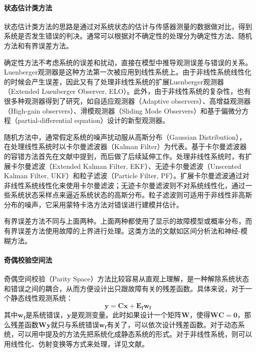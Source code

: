 \documentclass{article}
\begin{document}
\paragraph{状态估计类方法}状态估计类方法的思路是通过对系统状态的估计与传感器测量的数据做对比，得到系统是否发生错误的判决。通常可以根据对不确定性的处理分为确定性方法、随机方法和有界误差方法\cite{Marzat2012modelbased}。

确定性方法\cite{1098323,ALCORTAGARCIA1997663}不考虑系统的误差和扰动，直接在模型中推导观测误差与错误的关系。Luenberger观测器\cite{1098323}是这种方法第一次被应用到线性系统上。由于非线性系统线性化的时候会产生误差，因此又有了处理非线性系统的扩展Luenberger观测器（Extended
Luenberger Observer, ELO）\cite{Nejjari2008Extended,ZEITZ1987149}。此外，由于非线性系统的复杂性，也有很多种观测器得到了研究，如自适应观测器（Adaptive observers）\cite{878691,Zhang2010290}、高增益观测器（High-gain observers）\cite{Busvelle2002HIGH}、滑模观测器（Sliding Mode Observers）\cite{Edwards2011Sliding,1269645}和基于偏微分方程（partial-differential equation）设计的新型观测器\cite{5717995}。

随机方法中，通常假定系统的噪声扰动服从高斯分布（Gaussian Distribution），在处理线性系统时以卡尔曼滤波器（Kalman Filter）为代表。基于卡尔曼滤波器的容错方法首先在文献\cite{MEHRA1971637}中提到，而后\cite{NIKOUKHAH19941851,539440,willsky1986detection}做了后续延伸工作。处理非线性系统时，有扩展卡尔曼滤波（Extended Kalman Filter, EKF）、无迹卡尔曼滤波（Unscented Kalman Filter, UKF）和粒子滤波（Particle Filter, PF）。扩展卡尔曼滤波通过对非线性系统线性化来使用卡尔曼滤波\cite{CHANG19952861}；无迹卡尔曼滤波则不对系统线性化，通过一些系统状态采样点来逼近系统状态的高斯分布\cite{4252507,XIONG2005113}。粒子滤波则可适用于非线性非高斯分布的噪声，它采用蒙特卡洛方法对错误进行建模并估计\cite{1271398,971661}。

有界误差方法不同与上面两种。上面两种都使用了显示的故障模型或概率分布，而有界误差方法使用故障的上界进行处理。这类方法的文献如区间分析法\cite{4547434}和神经-模糊方法\cite{Korbicz2007609}。

\paragraph{奇偶校验空间法}奇偶空间校验（Parity Space）方法比较容易从直观上理解，是一种解除系统状态和错误之间的耦合，从而方便设计出只跟故障有关的残差函数\cite{patton1991review,GERTLER1995627}。具体来说，对于一个静态线性观测系统：
\begin{equation*}
    \mathbf{y} = \mathbf{Cx} + \mathbf{E_fw_f}
\end{equation*}
其中$\mathbf{w_f}$是系统错误，$\mathbf{y}$是观测变量。此时如果设计一个矩阵$\mathbf{W}$，使得$\mathbf{WC=0}$，那么残差函数$\mathbf{Wy}$就只与系统错误$\mathbf{w_f}$有关了，可以依次设计残差函数。对于动态系统，可以用\cite{Marzat2012modelbased}中提及的方法先把系统化成静态系统的形式。对于非线性系统，则可以用线性化、仿射变换等方式来处理，详见文献\cite{Staroswiecki2001687,shumsky2007redundancy,1024022,948476}。
\end{document}
